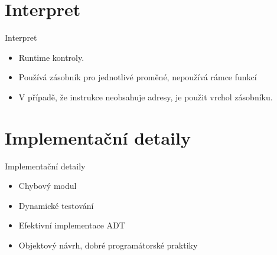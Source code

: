 \documentclass{beamer}
\newenvironment{fitbox}[1]
  {\begin{beamerboxesrounded}[upper=upper,shadow=true]
  {#1}}
  {\end{beamerboxesrounded}}
\begin{document}
\section{Interpret}
\begin{frame}
\begin{fitbox}{Interpret}
\begin{itemize}
	\item Runtime kontroly.
	\item Používá zásobník pro jednotlivé proměné, nepoužívá rámce funkcí
	\item V případě, že instrukce neobsahuje adresy, je použit vrchol zásobníku.
\end{itemize}
\end{fitbox}
\end{frame}



\section{Implementační detaily}
\begin{frame}

\begin{fitbox}{Implementační detaily}
\begin{itemize}
	\item Chybový modul
	\item Dynamické testování
	\item Efektivní implementace ADT
	\item Objektový návrh, dobré programátorské praktiky
\end{itemize}
\end{fitbox}

\end{frame}
\end{document}
